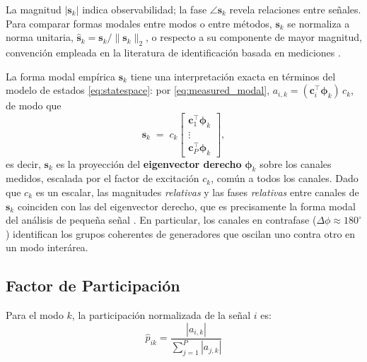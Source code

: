 La magnitud $|\mathbf{s}_k|$ indica observabilidad; la fase $\angle\mathbf{s}_k$ revela relaciones entre señales. Para comparar formas
modales entre modos o entre métodos, $\mathbf{s}_k$ se normaliza a norma
unitaria, $\hat{\mathbf{s}}_k = \mathbf{s}_k / \lVert\mathbf{s}_k\rVert_2$,
o respecto a su componente de mayor magnitud, convención empleada en la
literatura de identificación basada en mediciones
\cite{jiang2021,li2020era}.

La forma modal empírica $\mathbf{s}_k$ tiene una interpretación exacta en
términos del modelo de estados \eqref{eq:statespace}: por
\eqref{eq:measured_modal}, $a_{i,k} =
(\mathbf{c}_i^\top\boldsymbol{\phi}_k)\,c_k$, de modo que
\begin{equation}
    \mathbf{s}_k \;=\; c_k
    \begin{bmatrix}
        \mathbf{c}_1^\top \boldsymbol{\phi}_k \\
        \vdots \\
        \mathbf{c}_P^\top \boldsymbol{\phi}_k
    \end{bmatrix},
    \label{eq:shape_link}
\end{equation}
es decir, $\mathbf{s}_k$ es la proyección del \textbf{eigenvector derecho}
$\boldsymbol{\phi}_k$ sobre los canales medidos, escalada por el factor de
excitación $c_k$, común a todos los canales. Dado que $c_k$ es un escalar,
las magnitudes \textit{relativas} y las fases \textit{relativas} entre
canales de $\mathbf{s}_k$ coinciden con las del eigenvector derecho, que es
precisamente la forma modal del análisis de pequeña señal
\cite{kundur1994}. En particular, los canales en contrafase
($\Delta\phi \approx 180^\circ$) identifican los grupos coherentes de
generadores que oscilan uno contra otro en un modo interárea.

\subsection{Factor de Participación}

Para el modo $k$, la participación normalizada de la señal $i$ es:
\begin{equation}
\hat{p}_{ik} = \frac{|a_{i,k}|}{\displaystyle\sum_{j=1}^{P} |a_{j,k}|}
\end{equation}

